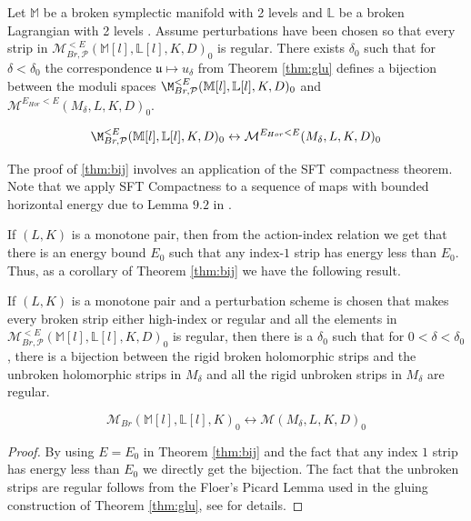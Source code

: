 \begin{Theorem} \label{thm:bij}
Let $\mathbb M$ be a broken symplectic manifold with 2 levels and $\mathbb L$  be a broken Lagrangian with 2 levels .  Assume perturbations have been chosen so that every strip in $\mathcal{M}^{<E}_{Br,\mathcal{P}}(\mathbb{M}[l],\mathbb{L}[l],K,D)_0$ is regular. There exists $\delta_0$ such that for $ \delta <\delta_0$ the correspondence $\mathfrak{u} \mapsto u_\delta$ from Theorem \ref{thm:glu} defines a bijection between the moduli spaces $\M^{<E}_{Br,\mathcal{P}}(\mathbb{M}[l],\mathbb{L}[l],K,D)_0$ and $\mathcal M ^{E_{Hor}< E}(M_{\delta},L,K,D)_0$.



$$\M^{<E}_{Br,\mathcal{P}}(\mathbb{M}[l],\mathbb{L}[l],K,D)_0 \leftrightarrow \mathcal M ^{E_{Hor}< E}(M_{\delta},L,K,D)_0$$
\end{Theorem}

\begin{remark}
    The proof of \ref{thm:bij} involves an application of the SFT compactness theorem. Note that we apply SFT Compactness to a sequence of maps with bounded horizontal energy due to Lemma $9.2$ in \cite{bhewz}.
\end{remark}


\noindent If $(L,K)$ is a monotone pair, then from the action-index relation we get that there is an energy bound $E_0$ such that any index-$1$ strip has energy less than $E_0$. Thus, as a corollary of  Theorem \ref{thm:bij} we have the following result.

\begin{cor}\label{corr:rigidregularbijection}
If $(L,K)$ is a monotone pair and a perturbation scheme is chosen that makes every broken strip either high-index or regular and all the elements in $\mathcal{M}^{<E}_{Br,\mathcal{P}}(\mathbb{M}[l],\mathbb{L}[l],K,D)_0$ is regular, then there is a $\delta_0$ such that for $0<\delta<\delta_0$, there is a bijection between the rigid broken holomorphic strips and the unbroken holomorphic strips in $M_\delta$ and all the rigid unbroken strips in $M_\delta$ are regular.

$$\mathcal {M} _{Br}(\mathbb{M}[l],\mathbb{L}[l],K)_0 \leftrightarrow \mathcal {M} (M_{\delta},L,K,D)_0$$

\end{cor}

\begin{proof}
By using $E=E_0$ in Theorem \ref{thm:bij} and the fact that any index $1$ strip has energy less than $E_0$ we directly get the bijection. The fact that the unbroken strips are regular follows from the Floer's Picard Lemma used in the gluing construction of Theorem \ref{thm:glu}, see \cite{palmerwoodwardsurg} for details. 
\end{proof}